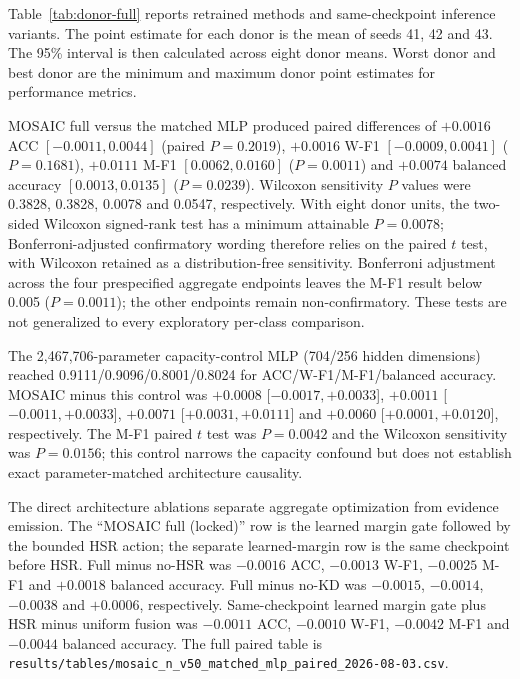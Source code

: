 \documentclass[10pt]{article}
\begin{document}
Table~\ref{tab:donor-full} reports retrained methods and same-checkpoint inference variants. The point estimate for each donor is the mean of seeds 41, 42 and 43. The 95\% interval is then calculated across eight donor means. Worst donor and best donor are the minimum and maximum donor point estimates for performance metrics.

\begin{table}[H]
\centering
\caption{Complete nested donor-disjoint performance matrix.}
\label{tab:donor-full}
\scriptsize
\setlength{\tabcolsep}{2.8pt}
\resizebox{\textwidth}{!}{%

}
\end{table}

MOSAIC full versus the matched MLP produced paired differences of $+0.0016$ ACC $[-0.0011,0.0044]$ (paired $P=0.2019$), $+0.0016$ W-F1 $[-0.0009,0.0041]$ ($P=0.1681$), $+0.0111$ M-F1 $[0.0062,0.0160]$ ($P=0.0011$) and $+0.0074$ balanced accuracy $[0.0013,0.0135]$ ($P=0.0239$). Wilcoxon sensitivity $P$ values were 0.3828, 0.3828, 0.0078 and 0.0547, respectively. With eight donor units, the two-sided Wilcoxon signed-rank test has a minimum attainable $P=0.0078$; Bonferroni-adjusted confirmatory wording therefore relies on the paired $t$ test, with Wilcoxon retained as a distribution-free sensitivity. Bonferroni adjustment across the four prespecified aggregate endpoints leaves the M-F1 result below 0.005 ($P=0.0011$); the other endpoints remain non-confirmatory. These tests are not generalized to every exploratory per-class comparison.

The 2,467,706-parameter capacity-control MLP (704/256 hidden dimensions) reached 0.9111/0.9096/0.8001/0.8024 for ACC/W-F1/M-F1/balanced accuracy. MOSAIC minus this control was $+0.0008$ [$-0.0017,+0.0033$], $+0.0011$ [$-0.0011,+0.0033$], $+0.0071$ [$+0.0031,+0.0111$] and $+0.0060$ [$+0.0001,+0.0120$], respectively. The M-F1 paired $t$ test was $P=0.0042$ and the Wilcoxon sensitivity was $P=0.0156$; this control narrows the capacity confound but does not establish exact parameter-matched architecture causality.

The direct architecture ablations separate aggregate optimization from evidence emission. The ``MOSAIC full (locked)'' row is the learned margin gate followed by the bounded HSR action; the separate learned-margin row is the same checkpoint before HSR. Full minus no-HSR was $-0.0016$ ACC, $-0.0013$ W-F1, $-0.0025$ M-F1 and $+0.0018$ balanced accuracy. Full minus no-KD was $-0.0015$, $-0.0014$, $-0.0038$ and $+0.0006$, respectively. Same-checkpoint learned margin gate plus HSR minus uniform fusion was $-0.0011$ ACC, $-0.0010$ W-F1, $-0.0042$ M-F1 and $-0.0044$ balanced accuracy. The full paired table is
\texttt{results/tables/mosaic\_n\_v50\_matched\_mlp\_paired\_2026-08-03.csv}.
\end{document}
